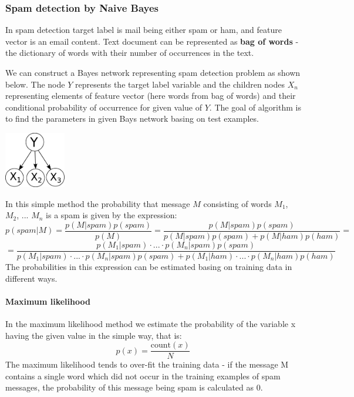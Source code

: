 \documentclass[a4paper,10pt]{article}
\begin{document}
\subsubsection{Spam detection by Naive Bayes}

In spam detection target label is mail being either spam or ham, and feature vector is an email content. Text document can be represented as \textbf{bag of words} - the dictionary of words with their number of occurrences in the text.

We can construct a Bayes network representing spam detection problem as shown below. The node $Y$ represents the target label variable and the children nodes $X_n$ representing elements of feature vector (here words from bag of words) and their conditional probability of occurrence for given value of $Y$. The goal of algorithm is to find the parameters in given Bays network basing on test examples.

\begin{center}
\includegraphics[width=0.2\textwidth]{NaiveBayes.pdf}
\end{center}

In this simple method the probability that message $M$ consisting of words $M_1$, $M_2$, ... $M_n$ is a spam is given by the expression:
\[ p(spam|M) = \frac{p(M|spam)p(spam)}{p(M)} = \frac{p(M|spam)p(spam)}{p(M|spam)p(spam) + p(M|ham)p(ham)} = \]
\[ = \frac{p(M_1|spam)\cdot ...\cdot p(M_n|spam)p(spam)}{p(M_1|spam)\cdot ...\cdot p(M_n|spam)p(spam) + p(M_1|ham)\cdot ...\cdot p(M_n|ham)p(ham)}  \]
The probabilities in this expression can be estimated basing on training data in different ways.

\paragraph*{Maximum likelihood}

In the maximum likelihood method we estimate the probability of the variable x having the given value in the simple way, that is:
\[p(x) = \frac{\mathrm{count}(x)}{N} \]
The maximum likelihood tends to over-fit the training data - if the message M contains a single word which did not occur in the training examples of spam messages, the probability of this message being spam is calculated as 0.
\end{document}
